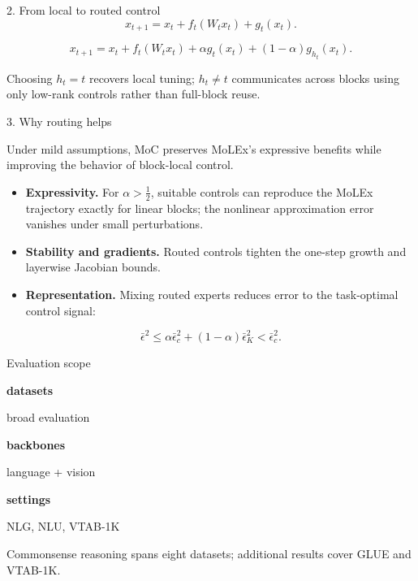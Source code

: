 \documentclass[final]{beamer}
\newlength{\colwidth}
\newcommand{\metric}[3]{%
  \begin{minipage}[t]{0.30\linewidth}
    \centering
    {\color{neuripspurple}\bfseries\fontsize{38}{42}\selectfont #1}\par
    \vspace{0.2ex}
    {\bfseries #2}\par
    {\footnotesize\color{neuripsmuted}#3}
  \end{minipage}%
}
\begin{document}
\begin{frame}[t]
\begin{columns}[t]
\begin{column}{\colwidth}
\begin{block}{2. From local to routed control}
    \[
      x_{t+1}=x_t+f_t(W_tx_t)+g_t(x_t).
    \]

    \[
      x_{t+1}=x_t+f_t(W_tx_t)
      +\alpha g_t(x_t)+(1-\alpha)g_{h_t}(x_t).
    \]

    Choosing $h_t=t$ recovers local tuning; $h_t\neq t$ communicates across
    blocks using only low-rank controls rather than full-block reuse.

  \end{block}

  \begin{exampleblock}{3. Why routing helps}

    Under mild assumptions, MoC preserves MoLEx's expressive benefits while
    improving the behavior of block-local control.

    \begin{itemize}
      \item \textbf{Expressivity.} For $\alpha>\tfrac12$, suitable controls can
        reproduce the MoLEx trajectory exactly for linear blocks; the nonlinear
        approximation error vanishes under small perturbations.
      \item \textbf{Stability and gradients.} Routed controls tighten the
        one-step growth and layerwise Jacobian bounds.
      \item \textbf{Representation.} Mixing routed experts reduces error to the
        task-optimal control signal:
    \end{itemize}
    \[
      \bar\epsilon^2
      \leq \alpha\bar\epsilon_c^2+(1-\alpha)\bar\epsilon_K^2
      < \bar\epsilon_c^2.
    \]

  \end{exampleblock}

  \begin{block}{Evaluation scope}
    \begin{center}
      \metric{33}{datasets}{broad evaluation}
      \hfill
      \metric{10}{backbones}{language + vision}
      \hfill
      \metric{3}{settings}{NLG, NLU, VTAB-1K}
    \end{center}

    \vspace{1ex}
    \footnotesize Commonsense reasoning spans eight datasets; additional results
    cover GLUE and VTAB-1K.
  \end{block}

\end{column}


\end{columns}
\end{frame}
\end{document}
